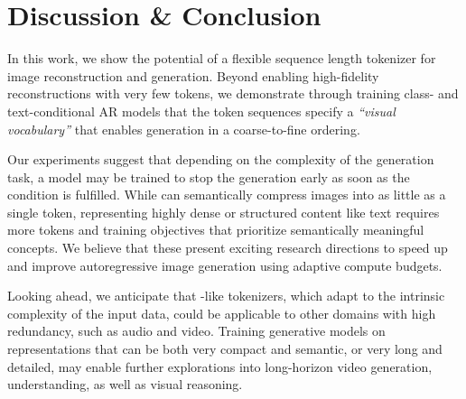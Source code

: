 \section{Discussion \& Conclusion}

In this work, we show the potential of a flexible sequence length tokenizer for image reconstruction and generation. Beyond enabling high-fidelity reconstructions with very few tokens, we demonstrate through training class- and text-conditional AR models that the \ours token sequences specify a \textit{``visual vocabulary''} that enables generation in a coarse-to-fine ordering. %

Our experiments suggest that depending on the complexity of the generation task, a model may be trained to stop the generation early as soon as the condition is fulfilled. While \ours can semantically compress images into as little as a single token, representing highly dense or structured content like text requires more tokens and training objectives that prioritize semantically meaningful concepts. We believe that these present exciting research directions to speed up and improve autoregressive image generation using adaptive compute budgets.

Looking ahead, we anticipate that \ours-like tokenizers, which adapt to the intrinsic complexity of the input data, could be applicable to other domains with high redundancy, such as audio and video. Training generative models on representations that can be both very compact and semantic, or very long and detailed, may enable further explorations into long-horizon video generation, understanding, as well as visual reasoning.
